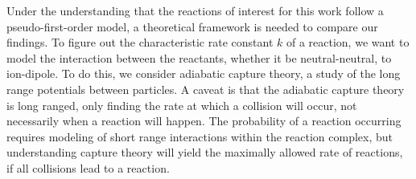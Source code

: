 Under the understanding that the reactions of interest for this work follow a pseudo-first-order model, a theoretical framework is needed to compare our findings. To figure out the characteristic rate constant $k$ of a reaction, we want to model the interaction between the reactants, whether it be neutral-neutral, to ion-dipole. To do this, we consider adiabatic capture theory, a study of the long range potentials between particles. A caveat is that the adiabatic capture theory is long ranged, only finding the rate at which a collision will occur, not necessarily when a reaction will happen. The probability of a reaction occurring requires modeling of short range interactions within the reaction complex, but understanding capture theory will yield the maximally allowed rate of reactions, if all collisions lead to a reaction.